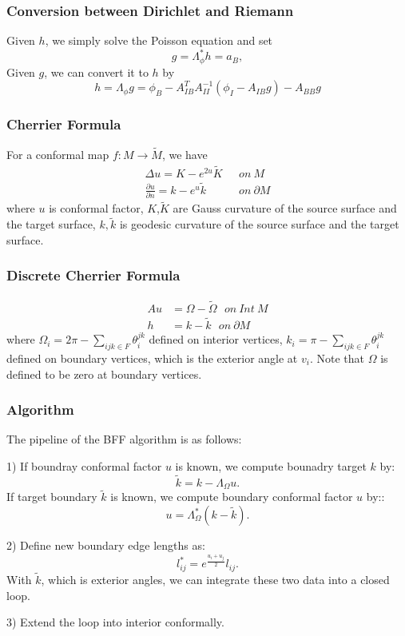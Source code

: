 \documentclass{beamer}
\begin{document}
\begin{frame}
\frametitle{Conversion between Dirichlet and Riemann}
Given $h$, we simply solve the Poisson equation and set 
\begin{equation}
g = \Lambda^*_\phi h = a_B,
\end{equation}
Given $g$, we can convert it to $h$  by
\begin{equation}
h = \Lambda_\phi g = \phi_B - A_{IB}^TA_{II}^{-1}(\phi_I - A_{IB}g) - A_{BB}g
\end{equation}
\end{frame}

\begin{frame}
\frametitle{Cherrier Formula}
For a conformal map $f: M \rightarrow \tilde{M}$, we have 
\begin{equation}
\begin{split}
\Delta u = K - e^{2u} \tilde{K} \ \ \ &on\ M\,\\
\frac{\partial u}{\partial n} = k - e^{u}\tilde{k} \ \ \ &on\     \partial M
\end{split}
\end{equation}
where $u$ is conformal factor, $K$,$\tilde{K}$ are Gauss curvature of the source surface and  the target surface, $k, \tilde{k}$ is geodesic curvature of the source surface and the target surface.


\end{frame}

\begin{frame}
\frametitle{Discrete Cherrier Formula}
\begin{equation}
\begin{split}
Au &=   \Omega - \tilde\Omega\  \ \ on\  Int\  M\\
h &= k - \tilde{k} \ \ \  on\ \partial M 
\end{split}
\label{eq:poisson}
\end{equation}
where $\Omega_i = 2\pi - \sum_{ijk \in F}\theta_i^{jk}$ defined on interior vertices, $k_i = \pi - \sum_{ijk \in F}\theta_i^{jk}$ defined on boundary vertices, which is the exterior angle at $v_i$. Note that $\Omega$ is defined to be zero at boundary vertices.
\end{frame}

\begin{frame}
\frametitle{Algorithm}
The pipeline of the BFF algorithm is as follows:

1) If boundray conformal factor ${u}$ is known, we compute bounadry target $k$ by: $$ \tilde{k} = k -\Lambda_{\Omega} u.$$
If target boundary $\tilde{k}$ is known, we compute boundary conformal factor $u$ by:: $$u = \Lambda_{\Omega}^{*}(k - \tilde{k}).$$

2) Define new boundary edge lengths as:
$$l_{ij}^* = e^{\frac{u_i + u_j}{2}}l_{ij}.$$ With $\tilde{k}$, which is exterior angles, we can integrate these two data into a closed loop.

3) Extend the loop into interior conformally.
\end{frame}
\end{document}
